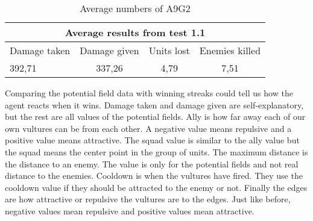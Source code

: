\begin{table}
\begin{centering}

 \begin{tabular}{|l|c|c|c|}
	\multicolumn{4}{c}{Average results from test 1.1} \\
	\hline
		Damage taken & Damage given & Units lost & Enemies killed\\
	\hline
		392,71 & 337,26 & 4,79 & 7,51 \\
	\hline
\end{tabular}
\caption{Average numbers of A9G2}
\label{test1.1}
\end{centering}
\end{table}
\newpage
Comparing the potential field data with winning streaks could tell us how the agent reacts when it wins. Damage taken and damage given are self-explanatory, but the rest are all values of the potential fields. Ally is how far away each of our own vultures can be from each other. A negative value means repulsive and a positive value means attractive. The squad value is similar to the ally value but the squad means the center point in the group of units. The maximum distance is the distance to an enemy. The value is only for the potential fields and not real distance to the enemies. Cooldown is when the vultures have fired. They use the cooldown value if they should be attracted to the enemy or not. Finally the edges are how attractive or repulsive the vultures are to the edges. Just like before, negative values mean repulsive and positive values mean attractive. 
\newpage
